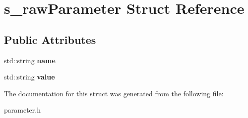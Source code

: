 \hypertarget{structs__rawParameter}{}\section{s\+\_\+raw\+Parameter Struct Reference}
\label{structs__rawParameter}
\subsection*{Public Attributes}
\begin{DoxyCompactItemize}
\item 
\mbox{\label{structs__rawParameter_adc33c81f18be5e4a799018b4bbaabe82}} 
std\+::string {\bfseries name}
\item 
\mbox{\label{structs__rawParameter_a8309e9f3e4b26f6629638a80a82788ba}} 
std\+::string {\bfseries value}
\end{DoxyCompactItemize}


The documentation for this struct was generated from the following file\+:\begin{DoxyCompactItemize}
\item 
parameter.\+h\end{DoxyCompactItemize}
